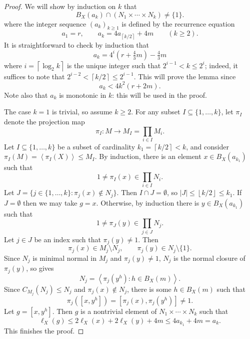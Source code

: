 \documentclass[10pt,a4paper]{amsart}
\def\len{\ell}
\newcommand\ceil[1]{\left\lceil#1\right\rceil}
\newcommand\floor[1]{\left\lfloor#1\right\rfloor}
\newcommand\gen[1]{\left\langle#1\right\rangle}
\renewcommand{\subset}{\subseteq} %
\begin{document}
\begin{proof}
    We will show by induction on $k$ that
    \[
            B_X(a_k) \cap (N_1 \times \cdots \times N_k) \ne \{1\}.
    \]
    where the integer sequence $(a_k)_{k \ge 1}$ is defined by the recurrence equation
    \[
        a_1 = r, \qquad a_k = 4 a_{\ceil{k/2}} + 4m \qquad (k \ge 2).
    \]
    It is straightforward to check by induction that
    \[
        a_k = 4^{i} (r + \tfrac43 m) - \tfrac 43m
    \]
    where $i = \ceil{\log_2 k}$ is the unique integer such that $2^{i-1} < k \le 2^i$; indeed, it suffices to note that $2^{i-2} < \ceil{k/2} \le 2^{i-1}$.
    This will prove the lemma since
    \[a_k < 4 k^2 (r + 2m).\]
    Note also that $a_k$ is monotonic in $k$: this will be used in the proof.

    The case $k = 1$ is trivial, so assume $k \ge 2$.
    For any subset $I \subseteq \{1, \dots, k\}$, let $\pi_I$ denote the projection map
    \[\pi_I: M \to M_I = \prod_{i\in I} M_i.\]
    Let $I \subset \{1, \dots, k\}$ be a subset of cardinality $k_1 = \ceil{k/2} < k$, and consider $\pi_I(M) = \gen{\pi_I(X)} \le M_I$.
    By induction, there is an element $x \in B_X(a_{k_1})$ such that
    \[
        1 \ne \pi_I(x) \in \prod_{i \in I} N_i.
    \]
    Let
    \(
        J = \{j \in \{1, \dots, k\} : \pi_j(x) \notin N_j\}.
    \)
    Then $I \cap J = \emptyset$, so $|J| \le \floor{k/2} \le k_1$.
    If $J = \emptyset$ then we may take $g = x$.
    Otherwise, by induction there is $y \in B_X(a_{k_1})$ such that
    \[
        1 \ne \pi_J(y) \in \prod_{j \in J} N_j.
    \]
    Let $j \in J$ be an index such that $\pi_j(y) \ne 1$.
    Then
    \[
        \pi_j(x) \in M_j \setminus N_j , \qquad \pi_j(y) \in N_j \setminus \{1\}.
    \]
    Since $N_j$ is minimal normal in $M_j$ and $\pi_j(y) \ne 1$,
    $N_j$ is the normal closure of $\pi_j(y)$, so  gives
    \[
        N_j = \gen{\pi_j(y^h) : h \in B_X(m)}.
    \]
    Since $C_{M_j}(N_j) \le N_j$ and $\pi_j(x) \notin N_j$, there is some $h \in B_X(m)$ such that
    \[
        \pi_j([x, y^h]) = [\pi_j(x), \pi_j(y^h)] \ne 1.
    \]
    Let $g = [x, y^h]$. Then $g$ is a nontrivial element of $N_1 \times \cdots \times N_k$ such that
    \[
        \len_X(g)
        \le 2 \len_X(x) + 2 \len_X(y) + 4 m
        \le 4 a_{k_1} + 4m = a_k.
    \]
    This finishes the proof.
\end{proof}
\end{document}
